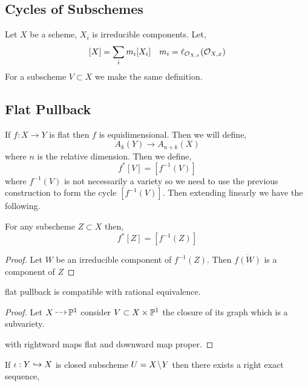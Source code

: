 \documentclass[12pt]{article}
\begin{document}
\subsection{Cycles of Subschemes}

Let $X$ be a scheme, $X_i$ is irreducible components. Let,
\[ [X] = \sum_i m_i [X_i] \quad m_i = \ell_{\stalk{X}{x}} (\stalk{X}{x}) \]
For a subscheme $V \subset X$ we make the same definition. 

\subsection{Flat Pullback}

If $f : X \to Y$ is flat then $f$ is equidimensional. Then we will define,
\[ A_k(Y) \to A_{n+k}(X) \]
where $n$ is the relative dimension. Then we define,
\[ f^* [V] = [f^{-1}(V)] \]
where $f^{-1}(V)$ is not necessarily a variety so we need to use the previous construction to form the cycle $[f^{-1}(V)]$. Then extending linearly we have the following.

\begin{lemma}
For any subscheme $Z \subset X$ then,
\[ f^* [Z] = [f^{-1}(Z)] \]
\end{lemma}

\begin{proof}
Let $W$ be an irreducible component of $f^{-1}(Z)$. Then $\overline{f(W)}$ is a component of $Z$
\end{proof}

\begin{theorem}
flat pullback is compatible with rational equivalence.
\end{theorem}

\begin{proof}
Let $X \rat \P^1$ consider $V \subset X \times \P^1$ the closure of its graph which is a subvariety. 
\begin{center}
\end{center}
with rightward maps flat and downward map proper. 
\end{proof}

\begin{prop}
If $\iota : Y \embed X$ is closed subscheme $U = X \sm Y$ then there exists a right exact sequence,
\begin{center}
\end{center}
\end{prop}
\end{document}
